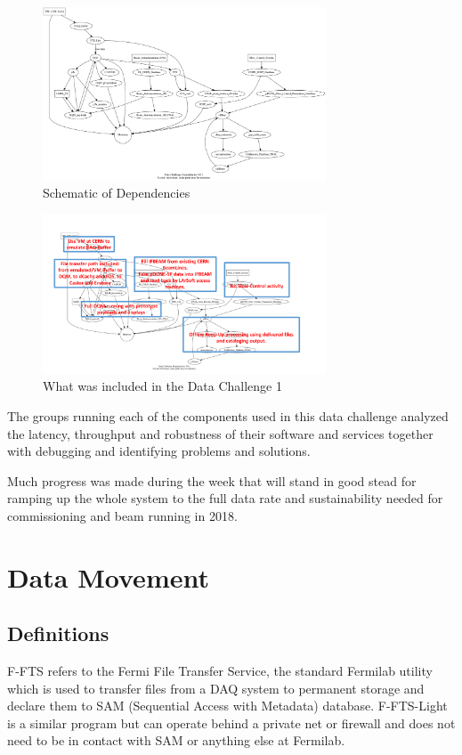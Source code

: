 \documentclass[pdftex,12pt,letter]{article}
\begin{document}
\begin{figure}[tbh]
  \centering
  \includegraphics[width=0.75\textwidth]{../figures/dc1_integration.png}
  \caption{Schematic of Dependencies}
  \label{fig:dependencies}
\end{figure}


\begin{figure}[tbh]
  \centering
  \includegraphics[width=0.75\textwidth]{./ReportImages/intermediate.pdf}
  \caption{What was included in the Data Challenge 1}
  \label{fig:intermediate}
\end{figure}

The groups running each of the components  used in this data challenge analyzed  the latency, throughput and robustness of their software and services together with debugging and identifying problems and solutions. 

Much progress was made during the week that  will stand in good stead for ramping up the whole system to the full data rate and sustainability needed for commissioning and beam running in 2018. 



\section {Data Movement}
\subsection {Definitions}
F-FTS refers to the Fermi File Transfer Service, the standard Fermilab utility which is used to transfer files from a DAQ system to permanent storage and declare them to SAM (Sequential Access with Metadata) database.  F-FTS-Light is a similar program but can operate behind a private net or firewall and does not need to be in contact with SAM or anything else at Fermilab.
\end{document}
